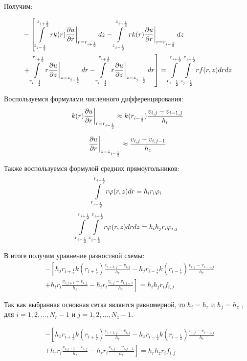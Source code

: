 Получим:

\begin{align*}
  &- \left [
   \mLimZ{z}{+\frac{1}{2}}{-\frac{1}{2}}{j}  \left . r k(r) \pdv{u}{r} \right \vert_{r = r_{i + \frac{1}{2}}} dz
  - \mLimZ{z}{+\frac{1}{2}}{-\frac{1}{2}}{j} \left . r k(r) \pdv{u}{r} \right \vert_{r = r_{i - \frac{1}{2}}} dz
  \right . \\
  &\left . + \mLimS{r}{+\frac{1}{2}}{-\frac{1}{2}} \left . r \pdv{u}{z} \right \vert_{z = z_{j + \frac{1}{2}}} dr
  - \mLimS{r}{+\frac{1}{2}}{-\frac{1}{2}} \left . r \pdv{u}{z} \right \vert_{z = z_{j - \frac{1}{2}}} dr
  \right ] = \mLim{+\frac{1}{2}}{-\frac{1}{2}}{+\frac{1}{2}}{-\frac{1}{2}} rf(r, z) dr dz
\end{align*}

Воспользуемся формулами численного дифференцирования:
\[
  \left . k(r) \pdv{u}{r} \right \vert_{r = r_{i - \frac{1}{2}}}
  \approx k(r_{i - \frac{1}{2}}) \frac{v_{i, j} - v_{i - 1, j}}{h_r}
\]

\[
  \left . \pdv{u}{r} \right \vert_{z = z_{j - \frac{1}{2}}}
  \approx \frac{v_{i, j} - v_{i, j - 1}}{h_z}
\]

Также воспользуемся формулой средних прямоугольников:
\[
  \mLimS{r}{+\frac{1}{2}}{-\frac{1}{2}} r \varphi(r, z) dr
  = \hbar_i r_i \varphi_i
\]
\[
  \mLim{+\frac{1}{2}}{-\frac{1}{2}}{+\frac{1}{2}}{-\frac{1}{2}} r \varphi(r, z) drdz
  = \hbar_i\hbar_j r_i \varphi_{i, j}
\]

В итоге получим уравнение разностной схемы:
\begin{align*}
  &- \left [ 
  \hbar_j r_{i+\frac{1}{2}} k(r_{i+\frac{1}{2}}) \frac{v_{i+1, j} - v_{i, j}}{h_{r}}
  - \hbar_j r_{i-\frac{1}{2}} k(r_{i-\frac{1}{2}}) \frac{v_{i, j} - v_{i - 1, j}}{h_{r}}
  \right . \\
  &\left .
  + \hbar_i r_{i} \frac{v_{i, j + 1} - v_{i, j}}{h_{z}}
  - \hbar_i r_{i} \frac{v_{i, j} - v_{i, j - 1}}{h_z}
  \right ]  = \hbar_i \hbar_j r_i f_{i, j}
\end{align*}

Так как выбранная основная сетка является равномерной, то $ \hbar_i = h_r $ и $ \hbar_j = h_z$
, для $ i = 1, 2, \dots, N_r - 1 $ и $ j = 1, 2, \dots, N_z - 1$.

\begin{align*}
  &- \left [ 
  h_z r_{i+\frac{1}{2}} k(r_{i+\frac{1}{2}}) \frac{v_{i+1, j} - v_{i, j}}{h_{r}}
  - h_z r_{i-\frac{1}{2}} k(r_{i-\frac{1}{2}}) \frac{v_{i, j} - v_{i - 1, j}}{h_{r}}
  \right . \\
  &\left .
  + h_r r_{i} \frac{v_{i, j + 1} - v_{i, j}}{h_{z}}
  - h_r r_{i} \frac{v_{i, j} - v_{i, j - 1}}{h_z}
  \right ]  = h_r h_z r_i f_{i, j}
\end{align*}

